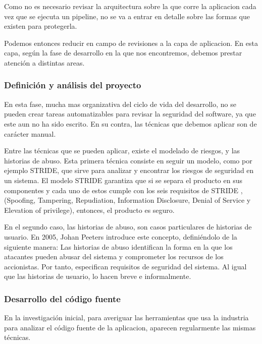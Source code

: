 \documentclass[12pt]{report} %
\begin{document}
Como no es necesario revisar la arquitectura sobre la que corre la
aplicacion cada vez que se ejecuta un \Gls{pipeline}, no se va a entrar en 
detalle sobre las formas que existen para protegerla.

Podemos entonces reducir en campo de revisiones a la capa de aplicacion.
En esta capa, según la fase de desarrollo en la que nos encontremos, debemos
prestar atención a distintas areas.

\subsubsection{Definición y análisis del proyecto}

En esta fase, mucha mas organizativa del ciclo de vida del desarrollo, no se
pueden crear tareas automatizables para revisar la seguridad del software, ya
que este aun no ha sido escrito.
En su contra, las técnicas que debemos aplicar son de carácter manual.

Entre las técnicas que se pueden aplicar, existe el modelado de riesgos, y las
historias de abuso.
Esta primera técnica consiste en seguir un modelo, como por ejemplo
\gls{STRIDE}, que sirve para analizar y encontrar los riesgos de seguridad en un
sistema.  
El modelo \gls{STRIDE} garantiza que si se separa el producto en sus
componentes y cada uno de estos cumple con los seis requisitos de \gls{STRIDE}
\cite{Loren1999}, (Spoofing, Tampering, Repudiation, Information Disclosure,
Denial of Service y Elevation of privilege), entonces, el producto es seguro.

En el segundo caso, las historias de abuso, son casos particulares de historias
de usuario.
En 2005, Johan Peeters introduce este concepto, definiéndolo de la siguiente
manera: 
Las historias de abuso identifican la forma en la que los atacantes pueden
abusar del sistema y comprometer los recursos de los accionistas.
Por tanto, especifican requisitos de seguridad del sistema.
Al igual que las historias de usuario, lo hacen breve e
informalmente. \cite{Peeters2005}

\subsubsection{Desarrollo del código fuente}

En la investigación inicial, para averiguar las herramientas que usa la
industria para analizar el código fuente de la aplicacion, aparecen regularmente
las mismas técnicas.
\end{document}

